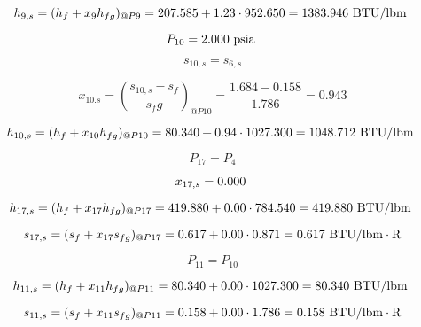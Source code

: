 \documentclass{article}
\begin{document}
\begin{equation}
  h_{ 9,s} = (h_{f} + x_{ 9}h_{fg})_{@P 9} =  207.585 + 1.23\cdot 952.650 = 1383.946
\textnormal{ BTU/lbm                   }
\end{equation}

\begin{equation}
P_{10} =    2.000\textnormal{ psia                      }
\end{equation}

\begin{equation}
s_{10,s} = s_{ 6,s}
\end{equation}

\begin{equation}
x_{10.s} = (\frac{s_{10,s} - s_{f}}{s_fg})_{@P10} = \frac{   1.684 -    0.158}{   1.786} =    0.943
\end{equation}

\begin{equation}
  h_{10,s} = (h_{f} + x_{10}h_{fg})_{@P10} =   80.340 + 0.94\cdot1027.300 = 1048.712
\textnormal{ BTU/lbm                   }
\end{equation}

\begin{equation}
P_{17} = P_{ 4}
\end{equation}

\begin{equation}
  x_{17,s} =    0.000\textnormal{                           }
\end{equation}

\begin{equation}
  h_{17,s} = (h_{f} + x_{17}h_{fg})_{@P17} =  419.880 + 0.00\cdot 784.540 =  419.880
\textnormal{ BTU/lbm                   }
\end{equation}

\begin{equation}
  s_{17,s} = (s_{f} + x_{17}s_{fg})_{@P17} =    0.617 + 0.00\cdot   0.871 =    0.617
\textnormal{ BTU/lbm}\cdot\textnormal{R}
\end{equation}

\begin{equation}
P_{11} = P_{10}
\end{equation}

\begin{equation}
  h_{11,s} = (h_{f} + x_{11}h_{fg})_{@P11} =   80.340 + 0.00\cdot1027.300 =   80.340
\textnormal{ BTU/lbm                   }
\end{equation}

\begin{equation}
  s_{11,s} = (s_{f} + x_{11}s_{fg})_{@P11} =    0.158 + 0.00\cdot   1.786 =    0.158
\textnormal{ BTU/lbm}\cdot\textnormal{R}
\end{equation}
\end{document}
